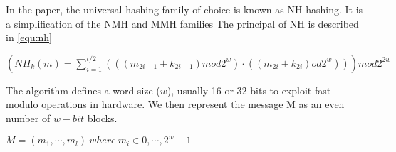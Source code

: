 

 In the paper, the universal hashing family of choice is known as NH hashing.
 It is a simplification of the NMH and MMH families
 The principal of NH is described in \ref{equ:nh}
\begin{algorithm}
$\left( NH_k(m) = \sum^{t/2}_{i=1} \left( \left( \left( m_{2i-1} + k_{2i-1} \right) mod 2^w
\right) \cdot \left( \left( m_{2i} + k_{2i} \right) od 2^w \right) \right)
\right) mod 2^{2w}$
\label{eqn:nh}
\end{algorithm}

The algorithm defines a word size ($w$), usually 16 or 32 bits to exploit fast
modulo operations in hardware. We then represent the message M as an even
number of $w-bit$ blocks.

$M = (m_1,\cdots,m_l)\ where\ m_i \in {0,\cdots,2^w-1}$


